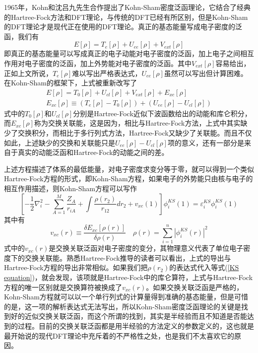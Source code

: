 \documentclass[12pt,a4paper,openany,twoside]{book}
\numberwithin{equation}{section}
\begin{document}
          1965年，Kohn和沈吕九先生合作提出了Kohn-Sham密度泛函理论，它结合了经典的Hartree-Fock方法和DFT理论，与传统的DFT已经有所区别，但是Kohn-Sham的DFT理论才是现代正在使用的DFT理论。真正的基态能量写成电子密度的泛函，我们有
          \begin{equation}
            E[\rho] = T_e[\rho] + U_{ee}[\rho] + V_{ext}[\rho]
          \end{equation}
          即真正的基态能量可以写成真正的电子动能对电子密度的泛函，加上电子之间相互作用对电子密度的泛函，加上外势能对电子密度的泛函。其中$ V_{ext}[\rho]$容易给出，正如上文所说，$T_e[\rho]$难以写出严格表达式，$U_{ee}[\rho]$虽然可以写出但计算困难。在Kohn-Sham的框架下，上式被重新改写了
          \begin{align}
            E[\rho] = T_0[\rho] + U_{cl}[\rho] + V_{ext}[\rho] + E_{xc}[\rho]
            \\E_{xc}[\rho]\equiv(T_e[\rho]-T_0[\rho])+(U_{ee}[\rho]-U_{cl}[\rho])
          \end{align}
          式中的$T_0[\rho]$和$U_{cl}[\rho]$分别是Hartree-Fock近似下波函数给出的动能和库仑积分，而$ E_{xc}[\rho]$称为交换关联能，这是因为，相比与Hartree-Fock方法，上式中其实缺少了交换积分，而相比于多行列式方法，Hartree-Fock又缺少了关联能。而且不仅如此，上述缺少的交换和关联能只是$U_{ee}[\rho]-U_{cl}[\rho]$项的意义，还有一部分是来自于真实的动能泛函和Hartree-Fock的动能之间的差。

          上述方程描述了体系的最低能量，对电子密度求变分等于零，就可以得到一个类似Hartree-Fock方程的形式，即Kohn-Sham方程，如果电子的外势能只由核与电子的相互作用描述，则Kohn-Sham方程可以写作
          \begin{equation}
            \left[-\frac{1}{2} \nabla_{i}^{2}-\sum_{A=1}^{M} \frac{Z_{A}}{r_{i A}}+\int \frac{\rho\left(r_{2}\right)}{r_{12}} d r_{2}+v_{x c}(1)\right] \phi_{i}^{K S}(1)=\varepsilon_{i}^{K S} \phi_{i}^{K S}(1)
            \label{KS equation}
          \end{equation}
          其中有
          \begin{equation*}
            v_{x c}(r) \equiv \frac{\delta E_{x c}[\rho(r)]}{\delta \rho(r)} \quad \rho(r)=\sum_{i=1}^{n}\left|\phi_{i}^{K S}(r)\right|^{2}
          \end{equation*}
          式中的$v_{x c}(r)$是交换关联泛函对电子密度的变分，其物理意义代表了单位电子密度下的交换关联能。熟悉Hartree-Fock推导的读者可以看出，上式的导出与Hartree-Fock方程的导出非常相似。如果我们把$\rho(r_2)$的表达式代入等式(\ref{KS equation})，就会发现，该项就是Hartree-Fock中的库仑算符，上式与Hartree-Fock方程的唯一区别就是交换算符被换成了$v_{x c}(r)$。如果交换关联泛函是严格的，Kohn-Sham方程就可以以一个单行列式的计算量得到准确的基态能量，但是可惜的是，这一项的解析表达式无法写出，所以Kohn-Sham密度泛函理论的关键是找到好的近似交换关联泛函，而这个所谓的找到，其实是半经验而且不知道是否能达到的过程。目前的交换关联泛函都是用半经验的方法定义的参数定义的，这也就是最开始说的现代DFT理论中充斥着的不严格性之处，也是我们不太喜欢它的原因。
\end{document}
